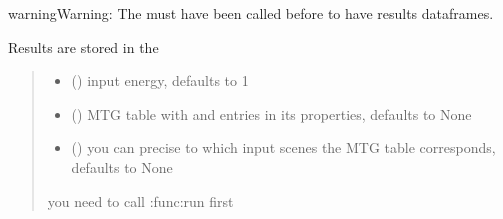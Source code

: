 \documentclass[letterpaper,10pt,english]{sphinxmanual}
\begin{document}
\begin{fulllineitems}
\begin{fulllineitems}
\begin{sphinxadmonition}{warning}{Warning:}
\sphinxAtStartPar
The {\hyperref[\detokenize{reference:LVM.LightVegeManager.run}]{}} must have been called before to have results dataframes.
\end{sphinxadmonition}

\sphinxAtStartPar
Results are  stored in the 
\begin{quote}\begin{description}
\begin{itemize}
\item {} 
\sphinxAtStartPar
{} (\sphinxstyleliteralemphasis{\sphinxupquote{, }}) \textendash{} input energy, defaults to 1

\item {} 
\sphinxAtStartPar
{} (\sphinxstyleliteralemphasis{\sphinxupquote{, }}) \textendash{} MTG table with  and  entries in its properties, defaults to None

\item {} 
\sphinxAtStartPar
{} (\sphinxstyleliteralemphasis{\sphinxupquote{, }}) \textendash{} you can precise to which input scenes the MTG table corresponds, defaults to None

\end{itemize}

\sphinxAtStartPar
{} \textendash{} you need to call :func:run first

\end{description}\end{quote}

\end{fulllineitems}



\end{fulllineitems}
\end{document}
